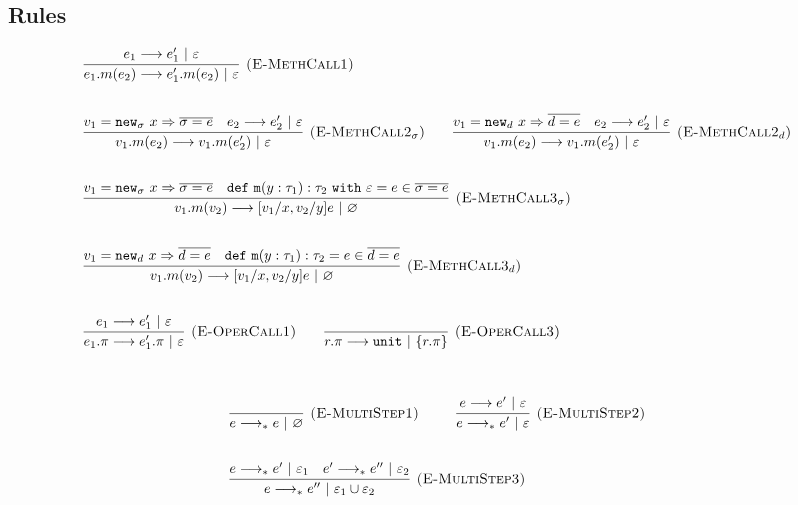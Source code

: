\documentclass{llncs}
\newcommand{\keywadj}[1]{\mathtt{#1}}
\newcommand{\keyw}[1]{\keywadj{#1}~}
\begin{document}
\subsection{Rules}




\[
\begin{array}{lll}

	\infer[\textsc{(E-MethCall1)}]
		{e_1.m(e_2) \longrightarrow e_1'.m(e_2)~|~\varepsilon}
		{e_1 \longrightarrow e_1'~|~\varepsilon}\\[5ex]

	\infer[\textsc{(E-MethCall2$_{\sigma}$)}]
		{v_1.m(e_2) \longrightarrow v_1.m(e_2')~|~\varepsilon}
		{v_1 = \keywadj{new}_{\sigma}~x \Rightarrow \overline{\sigma = e} & e_2 \longrightarrow e_2'~|~\varepsilon}
				
		~~~~~~
	\infer[\textsc{(E-MethCall2$_d$)}]
		{v_1.m(e_2) \longrightarrow v_1.m(e_2')~|~\varepsilon}
		{v_1 = \keywadj{new}_{d}~x \Rightarrow \overline{d = e} & e_2 \longrightarrow e_2'~|~\varepsilon}
		\\[5ex]
		
	\infer[\textsc{(E-MethCall3$_{\sigma}$)}]
		{v_1.m(v_2)
			\longrightarrow
		 [v_1/x, v_2/y]e~|~\varnothing}
  		{v_1 = \keywadj{new}_{\sigma}~x \Rightarrow \overline{\sigma = e} & \keywadj{def~m}(y: \tau_1) : \tau_2~\keyw{with} \varepsilon = e \in \overline {\sigma = e}} \\[5ex]

	\infer[\textsc{(E-MethCall3$_{d}$)}]
		{v_1.m(v_2)
			\longrightarrow
		 [v_1/x, v_2/y]e~|~\varnothing}
  		{v_1 = \keywadj{new}_{d}~x \Rightarrow \overline{d = e} & \keywadj{def~m}(y: \tau_1) : \tau_2 = e \in \overline {d = e}} \\[5ex]
			
	\infer[\textsc{(E-OperCall1)}]
		{e_1.\pi
			\longrightarrow
		 e_1'.\pi~|~\varepsilon}
		{e_1 \longrightarrow e_1'~|~\varepsilon}
~~~~~~

			\infer[\textsc{(E-OperCall3)}]
		{r.\pi
			\longrightarrow
		 \keywadj{unit}~|~\{r.\pi\}}
		{} \\[5ex]
			
\end{array}
\]




\[
\begin{array}{lll}

	\infer[\textsc{(E-MultiStep1)}]
	{e \longrightarrow_* e~|~\varnothing}
	{} ~~~~~~~~
	
	\infer[\textsc{(E-MultiStep2)}]
	{e \longrightarrow_* e'~|~\varepsilon}
	{e \longrightarrow e'~|~\varepsilon} \\[5ex]

	\infer[\textsc{(E-MultiStep3)}]
	{e \longrightarrow_* e''~|~\varepsilon_1 \cup \varepsilon_2}
	{e \longrightarrow_* e'~|~\varepsilon_1 & e' \longrightarrow_* e''~|~\varepsilon_2}

\end{array}
\]
\end{document}
